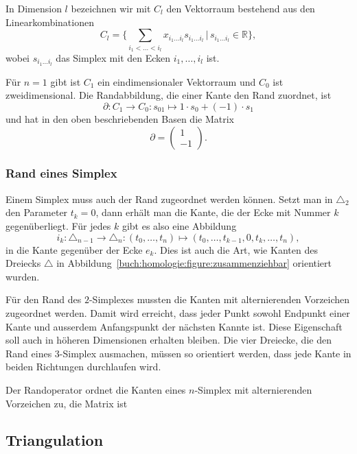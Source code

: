 In Dimension $l$ bezeichnen wir mit $C_l$  den Vektorraum bestehend
aus den Linearkombinationen
\[
C_l
=
\biggl\{
\sum_{i_1<\dots<i_l} x_{i_1\dots i_l} s_{i_1\dots i_l}
\,
\bigg|
\,
s_{i_1\dots i_l}\in\mathbb{R}
\biggr\},
\]
wobei $s_{i_1\dots i_l}$ das Simplex mit den Ecken $i_1,\dots,i_l$ ist.

Für $n=1$ gibt ist $C_1$ ein eindimensionaler Vektorraum und $C_0$
ist zweidimensional.
Die Randabbildung, die einer Kante den Rand zuordnet, ist
\[
\partial
\colon 
C_1\to C_0
:
s_{01}
\mapsto
1\cdot s_0 + (-1)\cdot s_1
\]
und hat in den oben beschriebenden Basen die Matrix
\[
\partial 
=
\begin{pmatrix}
1\\
-1
\end{pmatrix}.
\]

\subsubsection{Rand eines Simplex}
Einem Simplex muss auch der Rand zugeordnet werden können.
Setzt man in $\triangle_2$ den Parameter $t_k=0$, dann erhält
man die Kante,
die der Ecke mit Nummer $k$ gegenüberliegt.
Für jedes $k$ gibt es also eine Abbildung
\[
i_k
\colon
\triangle_{n-1} \to \triangle_n
:
(t_0,\dots,t_n)
\mapsto
(t_0,\dots,t_{k-1},0,t_{k},\dots,t_n),
\]
in die Kante gegenüber der Ecke $e_k$.
Dies ist auch die Art, wie Kanten des Dreiecks $\triangle$ 
in Abbildung~\ref{buch:homologie:figure:zusammenziehbar}
orientiert wurden.

Für den Rand des $2$-Simplexes mussten die Kanten mit alternierenden
Vorzeichen zugeordnet werden.
Damit wird erreicht, dass jeder Punkt sowohl Endpunkt einer 
Kante und
ausserdem Anfangspunkt der nächsten Kannte ist.
Diese Eigenschaft soll auch in höheren Dimensionen erhalten bleiben.
Die vier Dreiecke, die den Rand eines $3$-Simplex ausmachen,
müssen so orientiert werden,
dass jede Kante in beiden Richtungen durchlaufen wird.

\begin{definition}
\label{buch:def:randoperator}
Der Randoperator ordnet die Kanten eines $n$-Simplex mit alternierenden
Vorzeichen zu, die Matrix ist
\[
\]
\end{definition}


\subsection{Triangulation
\label{buch:subsection:triangulation}}


